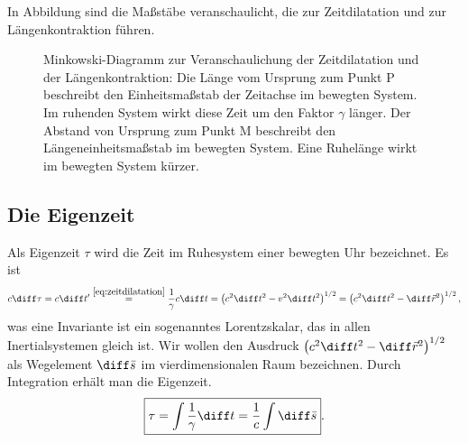 In Abbildung  sind die Maßstäbe veranschaulicht, die zur Zeitdilatation und zur Längenkontraktion führen. 

\begin{figure}[htp]
    \centering
    \tfigMinkowskiZeitdilatationLaengenkontraktion
    \caption{Minkowski-Diagramm zur Veranschaulichung der Zeitdilatation und der Längenkontraktion: 
    Die Länge vom Ursprung zum Punkt P beschreibt den Einheitsmaßstab der Zeitachse im bewegten System. 
    Im ruhenden System wirkt diese Zeit um den Faktor $\gamma$ länger. 
    Der Abstand von Ursprung zum Punkt M beschreibt den Längeneinheitsmaßstab im bewegten System. 
    Eine Ruhelänge wirkt im bewegten System kürzer. }
    \label{fig:minkowski_zeitdilatation_laengenkontraktion}
\end{figure}



\subsection{Die Eigenzeit}

Als Eigenzeit $\tau$ wird die Zeit im Ruhesystem einer bewegten Uhr bezeichnet. Es ist 
\begin{align*}
    c\diff\tau=c\diff t' \overset{\eqref{eq:zeitdilatation}}{=} \frac{1}{\gamma} c\diff t =\left(c^2\diff t^2-v^2\diff t^2\right)^{1/2} = \left(c^2\diff t^2-\diff\vec r^2\right)^{1/2},
\end{align*}
was eine Invariante ist \textendash{} ein sogenanntes Lorentzskalar, das in allen Inertialsystemen gleich ist. 
Wir wollen den Ausdruck $\left(c^2\diff t^2-\diff\vec r^2\right)^{1/2}$ als Wegelement $\diff\bar{s}$ im vierdimensionalen Raum bezeichnen. 
Durch Integration erhält man die Eigenzeit. 
\begin{align*}
    \boxed{\tau=\int \frac{1}{\gamma}\diff t=\frac{1}{c}\int\diff\bar{s}}. 
\end{align*}